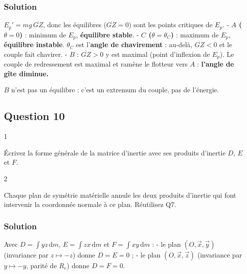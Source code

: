 \documentclass[11pt,a4paper]{article}
\begin{document}
\hypertarget{solution-8}{%
\subsubsection{Solution}\label{solution-8}}

\(E_p'=mg\,\overline{GZ}\), donc les équilibres (\(\overline{GZ}=0\)) sont les points critiques de \(E_p\).
- \textbf{\(A\) (\(\theta=0\))} : minimum de \(E_p\), \textbf{équilibre stable}.
- \textbf{\(C\) (\(\theta=\theta_C\))} : maximum de \(E_p\), \textbf{équilibre instable}. \(\theta_C\) est l'\textbf{angle de chavirement} : au-delà, \(\overline{GZ}<0\) et le couple fait chavirer.
- \textbf{\(B\)} : \(\overline{GZ}>0\) y est maximal (point d'inflexion de \(E_p\)). Le couple de redressement est maximal et ramène le flotteur vers \(A\) : \textbf{l'angle de gîte diminue.}

\begin{piege}

\(B\) n'est pas un équilibre : c'est un extremum du couple, pas de l'énergie.

\end{piege}

\hypertarget{question-10}{%
\subsection{Question 10}\label{question-10}}

\begin{indication}{1}

Écrivez la forme générale de la matrice d'inertie avec ses produits d'inertie \(D\), \(E\) et \(F\).

\end{indication}

\begin{indication}{2}

Chaque plan de symétrie matérielle annule les deux produits d'inertie qui font intervenir la coordonnée normale à ce plan. Réutilisez Q7.

\end{indication}

\hypertarget{solution-9}{%
\subsubsection{Solution}\label{solution-9}}

Avec \(D=\int yz\,\mathrm dm\), \(E=\int zx\,\mathrm dm\) et \(F=\int xy\,\mathrm dm\) :
- le plan \((O,\vec x,\vec y)\) (invariance par \(z\mapsto-z\)) donne \(D=E=0\) ;
- le plan \((O,\vec x,\vec z)\) (invariance par \(y\mapsto-y\), parité de \(R_e\)) donne \(D=F=0\).
\end{document}

